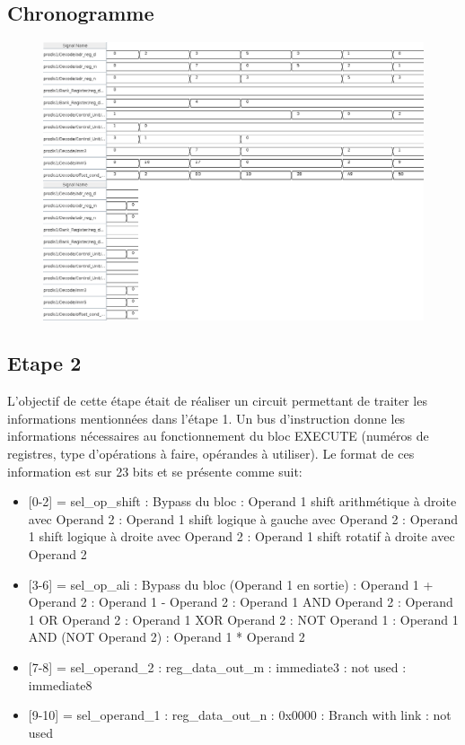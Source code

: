 \documentclass[a4paper]{article} %
\begin{document}
\subsection{Chronogramme}
\begin{figure}[H]
    \centering
    \includegraphics[width=.8\textwidth]{src/CHRONO_ETAPE1.png}
    \label{fig:Chronogramme}
\end{figure}

\subsection{Etape 2}
L'objectif de cette étape était de réaliser un circuit permettant de traiter les informations mentionnées dans l'étape 1.
Un bus d'instruction donne les informations nécessaires au fonctionnement du bloc EXECUTE (numéros de registres, type d'opérations à faire, opérandes à utiliser). Le format de ces information est sur 23 bits et se présente comme suit: \medskip \\
\begin{itemize}
\item{[0-2] = sel\_op\_shift}
    : Bypass du bloc
    : Operand 1 shift arithmétique à droite avec Operand 2
    : Operand 1 shift logique à gauche avec Operand 2
    : Operand 1 shift logique à droite avec Operand 2
    : Operand 1 shift rotatif à droite avec Operand 2
\item{[3-6] = sel\_op\_ali}
    : Bypass du bloc (Operand 1 en sortie)
    : Operand 1 + Operand 2
    : Operand 1 - Operand 2
    : Operand 1 AND Operand 2
    : Operand 1 OR Operand 2
    : Operand 1 XOR Operand 2
    : NOT Operand 1
    : Operand 1 AND (NOT Operand 2)
    : Operand 1 * Operand 2
\item{[7-8] = sel\_operand\_2}
    : reg\_data\_out\_m
    : immediate3
    : not used
    : immediate8
\item{[9-10] = sel\_operand\_1}
    : reg\_data\_out\_n
    : 0x0000
    : Branch with link
    : not used
\end{itemize}
\end{document}

